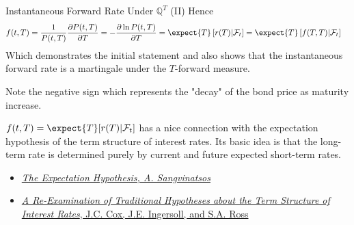 \documentclass{beamer}
\begin{document}
\begin{frame}{Instantaneous Forward Rate Under $\mathbb{Q}^T$ (II)}
	Hence
	\begin{equation*}
		\begin{aligned}
			f(t,T)&=\frac{1}{P(t,T)}\frac{\partial P(t,T)}{\partial T}=
			-\frac{\partial \ln P(t,T)}{\partial T}
			= \expect{T}\left[r(T)|\mathcal{F}_t\right]=	\expect{T}\left[f(T,T)|\mathcal{F}_t\right]
		\end{aligned}
	\end{equation*}
	Which demonstrates the initial statement and also shows that \textcolor{maincolor}{the instantaneous forward rate is a martingale under the $T$-forward measure}.
	\myendproof
	
	Note the negative sign which represents the "decay" of the bond
	price as maturity increase.
	
	\begin{tcolorbox}[colback=gray!5, colframe=maincolor, arc=0mm, boxrule=0.5pt]
		\footnotesize
		$f(t, T) = \expect{T}[r(T)|\mathcal{F}_t]$ has a nice connection with the \textcolor{maincolor}{expectation hypothesis of the term structure of interest rates}.
		Its basic idea is that the long-term rate is determined purely by current and future expected short-term rates.
		\begin{itemize}
			\item \href{https://pages.stern.nyu.edu/~sternfin/asangvin/ExpHyp.pdf}{\emph{The Expectation Hypothesis, A. Sangvinatsos}}
			\item \href{https://www.jstor.org/stable/2327547}{\emph{A Re-Examination of Traditional Hypotheses about the Term Structure of Interest Rates}, J.C. Cox, J.E. Ingersoll, and S.A. Ross}
		\end{itemize}
	\end{tcolorbox}
\end{frame}
\end{document}
